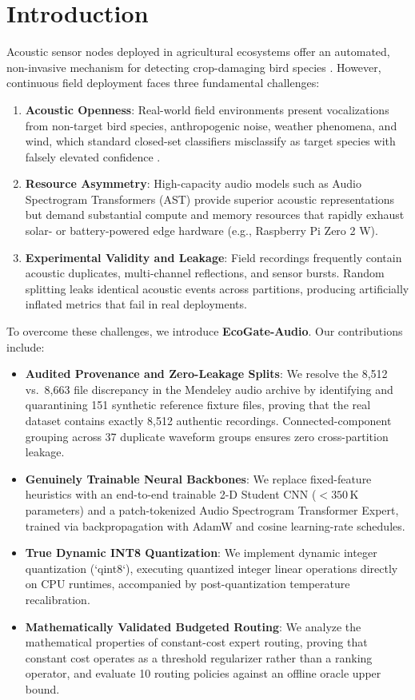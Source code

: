 \documentclass[11pt,a4paper]{article}
\begin{document}
\section{Introduction}
Acoustic sensor nodes deployed in agricultural ecosystems offer an automated, non-invasive mechanism for detecting crop-damaging bird species \cite{kahl2021birdnet}. However, continuous field deployment faces three fundamental challenges:
\begin{enumerate}
    \item \textbf{Acoustic Openness}: Real-world field environments present vocalizations from non-target bird species, anthropogenic noise, weather phenomena, and wind, which standard closed-set classifiers misclassify as target species with falsely elevated confidence \cite{scheirer2013open,bendale2016openmax}.
    \item \textbf{Resource Asymmetry}: High-capacity audio models such as Audio Spectrogram Transformers (AST) \cite{gong2021ast} provide superior acoustic representations but demand substantial compute and memory resources that rapidly exhaust solar- or battery-powered edge hardware (e.g., Raspberry Pi Zero 2 W).
    \item \textbf{Experimental Validity and Leakage}: Field recordings frequently contain acoustic duplicates, multi-channel reflections, and sensor bursts. Random splitting leaks identical acoustic events across partitions, producing artificially inflated metrics that fail in real deployments.
\end{enumerate}

To overcome these challenges, we introduce \textbf{EcoGate-Audio}. Our contributions include:
\begin{itemize}
    \item \textbf{Audited Provenance and Zero-Leakage Splits}: We resolve the 8,512 vs.\ 8,663 file discrepancy in the Mendeley audio archive by identifying and quarantining 151 synthetic reference fixture files, proving that the real dataset contains exactly 8,512 authentic recordings. Connected-component grouping across 37 duplicate waveform groups ensures zero cross-partition leakage.
    \item \textbf{Genuinely Trainable Neural Backbones}: We replace fixed-feature heuristics with an end-to-end trainable 2-D Student CNN ($<350$\,K parameters) and a patch-tokenized Audio Spectrogram Transformer Expert, trained via backpropagation with AdamW and cosine learning-rate schedules.
    \item \textbf{True Dynamic INT8 Quantization}: We implement dynamic integer quantization (`qint8`), executing quantized integer linear operations directly on CPU runtimes, accompanied by post-quantization temperature recalibration.
    \item \textbf{Mathematically Validated Budgeted Routing}: We analyze the mathematical properties of constant-cost expert routing, proving that constant cost operates as a threshold regularizer rather than a ranking operator, and evaluate 10 routing policies against an offline oracle upper bound.
\end{itemize}
\end{document}
